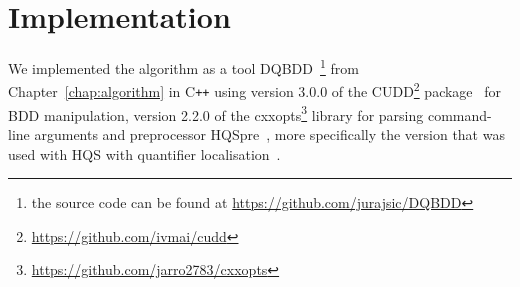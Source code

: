 \documentclass[
  digital, %
  color,
  twoside, %
  table,   %
  nolof,     %
  nolot,     %
]{fithesis3}
\theoremstyle{definition}
\theoremstyle{remark}
\newcommand{\vars}[1]{V_{#1}}
\newcommand{\prefix}[1]{Q({#1})}
\newcommand{\eprefix}[1]{Q_{\exists}(#1)}
\newcommand{\uprefix}[1]{Q_{\forall}(#1)}
\newcommand{\children}[1]{children({#1})}
\begin{document}
\begin{itemize}
\end{itemize}



\chapter{Implementation}
\label{chap:implementation}
We implemented the algorithm as a tool DQBDD~\footnote{the source code can be found at \url{https://github.com/jurajsic/DQBDD}} from Chapter~\ref{chap:algorithm} in C\texttt{++} using version 3.0.0 of the CUDD\footnote{\url{https://github.com/ivmai/cudd}} package~\cite{CUDD} for BDD manipulation, version 2.2.0 of the cxxopts\footnote{\url{https://github.com/jarro2783/cxxopts}} library for parsing command-line arguments and preprocessor HQSpre~\cite{HQSpre2}, more specifically the version that was used with HQS with quantifier localisation~\cite{HQSquantifierLocalisation}.
\end{document}

